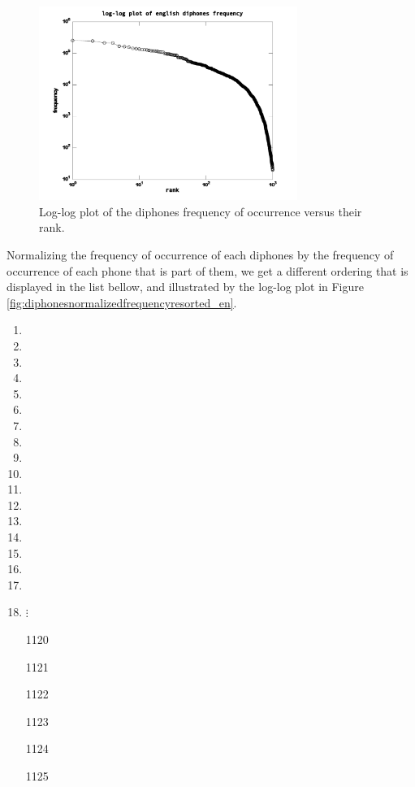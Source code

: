\begin{figure}[h!]
\centering
\includegraphics[width=0.75\textwidth]{images/diphonesfrequency_en.pdf}
\caption{Log-log plot of the diphones frequency of occurrence versus their rank.}
\label{fig:diphonesfrequency_en}
\end{figure} 




Normalizing the frequency of occurrence of each diphones by the frequency of occurrence of each phone that is part of them, we get a different ordering that is displayed in the list bellow, and illustrated by the log-log plot in Figure \ref{fig:diphonesnormalizedfrequencyresorted_en}.

\begin{tiny}
\begin{multicols}{6}
\begin{enumerate}
    \item {}
    \item {}
    \item {}
    \item {} 
    \item {}
    \item {}
    \item {}
    \item {}
    \item {} 
    \item {}
    \item {}
    \item {}
    \item {}
    \item {}
    \item {} 
    \item {}
    \item {}
    \item $\vdots$
	\item[1120] 
	\item[1121] 
	\item[1122] 
	\item[1123] 
	\item[1124] 
	\item[1125] 
\end{enumerate}
\end{multicols}
\end{tiny}


